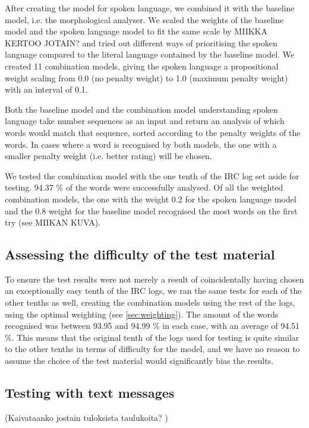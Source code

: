 \documentclass[a4paper,conference]{IEEEtran}
\begin{document}
After creating the model for spoken language, we combined it with the baseline model, i.e. the morphological analyser. We scaled the weights of the baseline model and the spoken language model to fit the same scale by MIIKKA KERTOO JOTAIN? and tried out different ways of prioritising the spoken language compared to the literal language contained by the baseline model. We created 11 combination models, giving the spoken language a propositional weight scaling from 0.0 (no penalty weight) to 1.0 (maximum penalty weight) with an interval of 0.1. 

Both the baseline model and the combination model understanding spoken language take number sequences as an input and return an analysis of which words would match that sequence, sorted according to the penalty weights of the words. In cases where a word is recognised by both models, the one with a smaller penalty weight (i.e. better rating) will be chosen.

We tested the combination model with the one tenth of the IRC log set aside for testing. 94.37 \% of the words were successfully analysed. Of all the weighted combination models, the one with the weight 0.2 for the spoken language model and the 0.8 weight for the baseline model recognised the most words on the first try (see MIIKAN KUVA).

\subsection{Assessing the difficulty of the test material}
\label{sec:difficulty}
To ensure the test results were not merely a result of coincidentally having chosen an exceptionally easy tenth of the IRC logs, we ran the same tests for each of the other tenths as well, creating the combination models using the rest of the logs, using the optimal weighting (see \ref{sec:weighting}). The amount of the words recognised was between 93.95 and 94.99 \% in each case, with an average of 94.51 \%. This means that the original tenth of the logs used for testing is quite similar to the other tenths in terms of difficulty for the model, and we have no reason to assume the choice of the test material would significantly bias the results.

\subsection{Testing with text messages}

(Kaivataanko jostain tuloksista taulukoita? )
 
\end{document}
